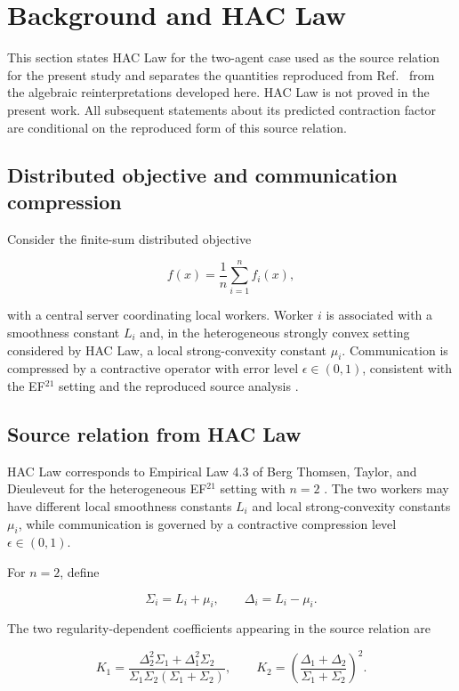 \section{Background and HAC Law}

This section states HAC Law for the two-agent case used as the source relation for the present study and separates the quantities reproduced from Ref.~\cite{thomsen2026tight} from the algebraic reinterpretations developed here. HAC Law is not proved in the present work. All subsequent statements about its predicted contraction factor are conditional on the reproduced form of this source relation.

\subsection{Distributed objective and communication compression}

Consider the finite-sum distributed objective

\[
f(x)=\frac{1}{n}\sum_{i=1}^{n} f_i(x),
\]

with a central server coordinating local workers. Worker $i$ is associated with a smoothness constant $L_i$ and, in the heterogeneous strongly convex setting considered by HAC Law, a local strong-convexity constant $\mu_i$. Communication is compressed by a contractive operator with error level $\epsilon\in(0,1)$, consistent with the EF$^{21}$ setting and the reproduced source analysis \citep{richtarik2021ef21,thomsen2026tight}.

\subsection{Source relation from HAC Law}

HAC Law corresponds to Empirical Law 4.3 of Berg Thomsen, Taylor, and Dieuleveut for the heterogeneous EF$^{21}$ setting with $n=2$ \citep{thomsen2026tight}. The two workers may have different local smoothness constants $L_i$ and local strong-convexity constants $\mu_i$, while communication is governed by a contractive compression level $\epsilon\in(0,1)$.

For $n=2$, define

\[
\Sigma_i=L_i+\mu_i,\qquad
\Delta_i=L_i-\mu_i.
\]

The two regularity-dependent coefficients appearing in the source relation are

\[
K_1=
\frac{\Delta_2^2\Sigma_1+\Delta_1^2\Sigma_2}
{\Sigma_1\Sigma_2(\Sigma_1+\Sigma_2)},
\qquad
K_2=
\left(
\frac{\Delta_1+\Delta_2}
{\Sigma_1+\Sigma_2}
\right)^2.
\]

